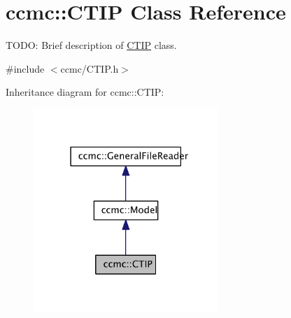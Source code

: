 \hypertarget{classccmc_1_1_c_t_i_p}{\section{ccmc\-:\-:C\-T\-I\-P Class Reference}
\label{classccmc_1_1_c_t_i_p}
}


T\-O\-D\-O\-: Brief description of \hyperlink{classccmc_1_1_c_t_i_p}{C\-T\-I\-P} class.  




{\ttfamily \#include $<$ccmc/\-C\-T\-I\-P.\-h$>$}



Inheritance diagram for ccmc\-:\-:C\-T\-I\-P\-:\nopagebreak
\begin{figure}[H]
\begin{center}
\leavevmode
\includegraphics[width=198pt]{classccmc_1_1_c_t_i_p__inherit__graph}
\end{center}
\end{figure}


